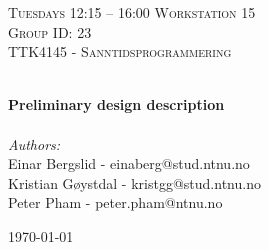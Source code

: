 
\begin{titlepage}
\vbox{ }
\vbox{ }
\begin{center}
\textsc{\LARGE Tuesdays 12:15 – 16:00 Workstation 15\\[1.5cm]Group ID: 23}\\[1.5cm]
\textsc{\Large TTK4145 - Sanntidsprogrammering}\\[0.5cm]
\vbox{ }

\HRule \\[0.4cm]
{ \huge \bfseries Preliminary design description}\\[0.4cm]
\HRule \\[1.5cm]

\large
\emph{Authors:}\\
Einar Bergslid - einaberg@stud.ntnu.no \\ 
Kristian Gøystdal - kristgg@stud.ntnu.no \\
Peter Pham - peter.pham@ntnu.no \\
\vfill

{\large \today}
\end{center}
\end{titlepage}